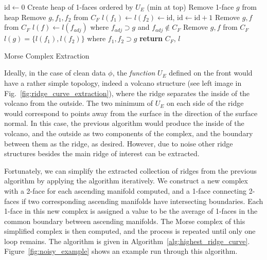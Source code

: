 \documentclass[10pt,journal,compsoc]{IEEEtran}
\begin{document}
\begin{algorithm}
  \begin{algorithmic}[1]
    \State {}
    \State $\mbox{id} \gets 0$
    \State Create heap of 1-faces ordered by $U_E$ (min at top)
    \Repeat 
    \State Remove 1-face $g$ from heap
    \State Remove $g, f_1, f_2$ from $C_F$
    \State $l(f_1) \gets l(f_2) \gets \mbox{id}$, $\mbox{id} \gets
    \mbox{id} +1$
    \State {}
    \State Remove $g,f$ from $C_F$
    \State $l(f) \gets l(f_{adj})$ where $f_{adj} \supset g$ and
    $f_{adj} \notin C_F$
    \State {}
    \State Remove $g,f$ from $C_F$
    \State $l(g) = \{ l(f_1), l(f_2) \}$ where $f_1,f_2 \supset g$ 
    \State {}
    \EndIf
    \State \textbf{return} $C_F$, $l$ 
    \EndProcedure
  \end{algorithmic}
  \caption{Morse Complex Extraction}
  \label{alg:ridge_extraction}
\end{algorithm}

Ideally, in the case of clean data $\phi$, the \emph{function} $U_E$
defined on the front would have a rather simple topology, indeed a
volcano structure (see left image in
Fig.~\ref{fig:ridge_curve_extraction}), where the ridge separates the
inside of the volcano from the outside. The two minimum of $U_E$ on
each side of the ridge would correspond to points away from the
surface in the direction of the surface normal. In this case, the
previous algorithm would produce the inside of the volcano, and the
outside as two components of the complex, and the boundary between
them as the ridge, as desired. However, due to noise other ridge
structures besides the main ridge of interest can be extracted.

Fortunately, we can simplify the extracted collection of ridges from
the previous algorithm by applying the algorithm iteratively. We
construct a new complex with a 2-face for each ascending manifold
computed, and a 1-face connecting 2-faces if two corresponding
ascending manifolds have intersecting boundaries. Each 1-face in this
new complex is assigned a value to be the average of 1-faces in the
common boundary between ascending manifolds. The Morse complex of this
simplified complex is then computed, and the process is repeated until
only one loop remains. The algorithm is given in
Algorithm~\ref{alg:highest_ridge_curve}. Figure~\ref{fig:noisy_example}
shows an example run through this algorithm.
\end{document}
